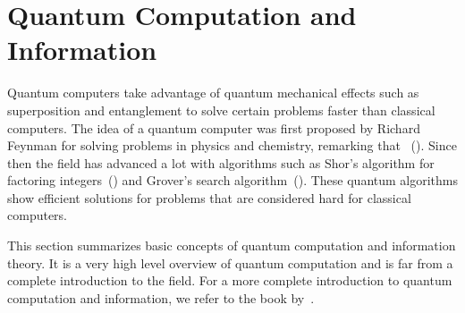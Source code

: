 \documentclass[a4paper,10pt]{article}
\begin{document}
\section{Quantum Computation and Information} \label{sec:quantum-computation-information}
Quantum computers take advantage of quantum mechanical effects such as superposition and entanglement to solve certain problems faster than classical computers.
The idea of a quantum computer was first proposed by Richard Feynman for solving problems in physics and chemistry, remarking that ~(\cite{feynman-simulating}).
Since then the field has advanced a lot with algorithms such as Shor's algorithm for factoring integers~(\cite{shor-factoring}) and Grover's search algorithm~(\cite{grover-search}).
These quantum algorithms show efficient solutions for problems that are considered hard for classical computers.

This section summarizes basic concepts of quantum computation and information theory.
It is a very high level overview of quantum computation and is far from a complete introduction to the field.
For a more complete introduction to quantum computation and information, we refer to the book by~\cite{nielsen-chuang}.
\end{document}
